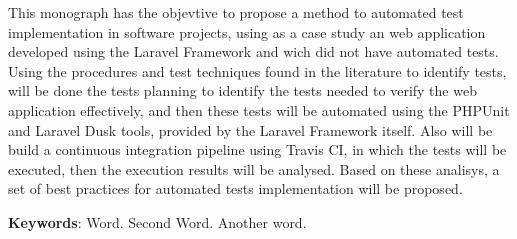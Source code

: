 
\begin{resumo}[ABSTRACT]
\begin{SingleSpacing}

This monograph has the objevtive to propose a method to automated test implementation in software projects, using as a case study an web application developed using the Laravel Framework and wich did not have automated tests. Using the procedures and test techniques found in the literature to identify tests, will be done the tests planning to identify the tests needed to verify the web application effectively, and then these tests will be automated using the PHPUnit and Laravel Dusk tools, provided by the Laravel Framework itself. Also will be build a continuous integration pipeline using Travis CI, in which the tests will be executed, then the execution results will be analysed. Based on these analisys, a set of best practices for automated tests implementation will be proposed. 


\textbf{Keywords}: Word. Second Word. Another word.

\end{SingleSpacing}
\end{resumo}

